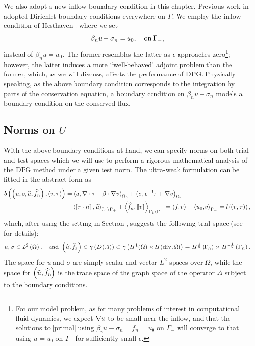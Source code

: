 We also adopt a new inflow boundary condition in this chapter.  Previous work in \cite{DPGrobustness} adopted Dirichlet boundary conditions everywhere on $\Gamma$.  We employ the inflow condition of Hesthaven \etal \cite{Hesthaven96astable}, where we set
\[
\beta_n u - \sigma_n  = u_0, \quad \text{on } \Gm,
\]
instead of $\beta_n u = u_0$. The former resembles the latter as $\epsilon$ approaches zero\footnote{For our model problem, as for many problems of interest in computational fluid dynamics, we expect $\grad u$ to be small near the inflow, and that the solutions to \eqref{primal} using $\beta_n u - \sigma_n = f_n = u_0$ on $\Gamma_-$ will converge to that using $u=u_0$ on $\Gamma_-$  for sufficiently small $\epsilon$.}; however, the latter induces a more ``well-behaved" adjoint problem than the former, which, as we will discuss, affects the performance of DPG. Physically speaking, as the above boundary condition corresponds to the integration by parts of the conservation equation, a boundary condition on $\beta_n u - \sigma_n$ models a boundary condition on the conserved flux.  


\subsection{Norms on $U$}

With the above boundary conditions at hand, we can specify norms on both trial and test spaces which we will use to perform a rigorous mathematical analysis of the DPG method under a given test norm. The ultra-weak formulation  can be fitted in the abstract form 
as
\begin{align*}
b\left(\left(u,\sigma, \widehat{u}, \widehat{f}_n\right), \left( v,
\tau\right)\right) &= \left(u,\div \tau - \beta \cdot \grad
v\right)_{\Oh} + \left(\sigma, \epsilon^{-1} \tau + \grad
v\right)_{\Oh} \\
&- \LRa{ \jump{\tau\cdot n}, \widehat{u} }_{\Gh
  \setminus \Gp} + \LRa{ \widehat{f}_n, \jump{v} }_{\Gamma_h \setminus
  \Gm} =  \left(f, v\right) -
\LRa{ u_0, v }_{\Gamma_-} = l\left(\left(v, \tau\right)\right),
\end{align*}
which, after using the setting in Section , suggests the following trial space (see \cite{analysisDPG, Bui-ThanhDemkowiczGhattas11b} for details):
\begin{align*}
u, \sigma \in \L, \quad \text{and } \LRp{\uh,\fnh} \in
\gamma\LRp{D\LRp{A}} \subset \gamma\LRp{  H^1(\Omega) \times
H({\rm div}, \Omega)} = H^{\frac{1}{2}}\left(\Gh\right) \times H^{-\frac{1}{2}}\left(\Gh\right).
\end{align*}
The space for $u$ and $\sigma$ are simply scalar and vector $L^2$ spaces over $\Omega$, while the space for $\left(\uh,\fnh\right)$ is the trace space of the graph space of the operator $A$ subject to the boundary conditions.


